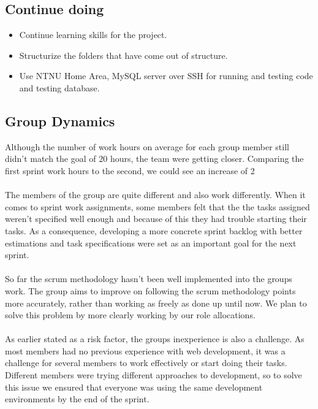 \subsection{Continue doing}
\label{subsec:S2RetrospectiveContinue}
\begin{itemize}
\item Continue learning skills for the project.
\item Structurize the folders that have come out of structure. 
\item Use NTNU Home Area, MySQL server over SSH for running and testing code and testing database.
\end{itemize}

\subsection{Group Dynamics}
\label{subsec:S2RetrospectiveDynamics}

Although the number of work hours on average for each group member still didn’t match the goal of 20 hours, the team were getting closer. Comparing the first sprint work hours to the second, we could see an increase of 2 %

\paragraph{} The members of the group are quite different and also work differently. When it comes to sprint work assignments, some members felt that the the tasks assigned weren’t specified well enough and because of this they had trouble starting their tasks. As a consequence, developing a more concrete sprint backlog with better estimations and task specifications were set as an important goal for the next sprint. 

\paragraph{} So far the scrum methodology hasn’t been well implemented into the groups work. The group aims to improve on following the scrum methodology points more accurately, rather than working as freely as done up until now. We plan to solve this problem by more clearly working by our role allocations. 

\paragraph{} As earlier stated as a risk factor, the groups inexperience is also a challenge. As most members had no previous experience with web development, it was a challenge for several members to work effectively or start doing their tasks. Different members were trying different approaches to development, so to solve this issue we ensured that everyone was using the same development environments by the end of the sprint. 

